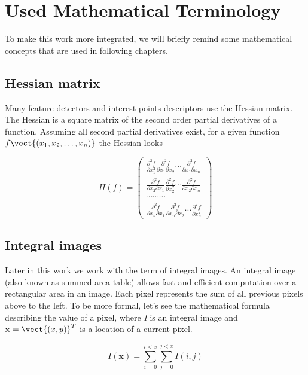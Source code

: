 \chapter{Used Mathematical Terminology}

To make this work more integrated, we will briefly remind some mathematical concepts that are used in following chapters. 

\section{Hessian matrix}

Many feature detectors and interest points descriptors use the Hessian matrix. 
The Hessian is a square matrix of the second order partial derivatives of a function. 
Assuming all second partial derivatives exist, for a given function $f\vect{(x_1, x_2, \ldots, x_n)}$ the Hessian looks

\[ H(f) = \left(\begin{array}{c}  
\frac{\partial^2 f}{\partial x_1^2} \frac{\partial^2 f}{\partial x_1 \partial x_2} 
\cdots \frac{\partial^2 f}{\partial x_1 \partial x_n}\\
\frac{\partial^2 f}{\partial x_2 \partial x_1} \frac{\partial^2 f}{\partial x_2^2} 
\cdots \frac{\partial^2 f}{\partial x_2\partial x_n}\\
\cdots \cdots \cdots \\
\frac{\partial^2 f}{\partial x_n \partial x_1} \frac{\partial^2 f}{\partial x_n \partial x_2} 
\cdots \frac{\partial^2 f}{\partial x_n^2}

\end{array}\right)  \]


\section{Integral images}

Later in this work we work with the term of integral images. 
An integral image (also known as summed area table) allows fast and efficient computation over a rectangular area in an image. 
Each pixel represents the sum of all previous pixels above to the left. 
To be more formal, let's see the mathematical formula describing the value of a 
pixel, where \emph{I} is an integral image and $\mathbf{x} = \vect{(x, y)}^{T}$ is a location of a current pixel.

\begin{equation}
 I (\mathbf{x}) = \sum_{i=0}^{i<x} \sum_{j=0}^{j<x} I (i,j)
 
\end{equation}


